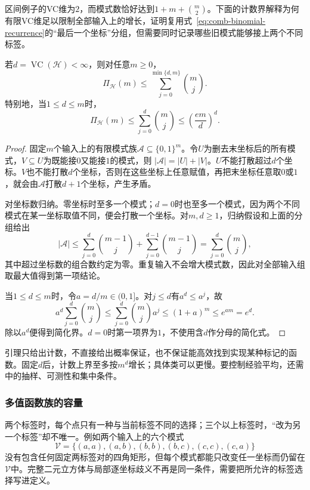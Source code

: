 区间例子的VC维为\(2\)，而模式数恰好达到\(1+m+\binom m2\)。下面的计数界解释为何有限VC维足以限制全部输入上的增长，证明复用式~\eqref{eq:comb-binomial-recurrence}的“最后一个坐标”分组，但需要同时记录哪些旧模式能够接上两个不同标签。
\begin{lemma}
  \label{lem:sauer-shelah}
  若\(d=\operatorname{VC}(\mathcal H)<\infty\)，则对任意\(m\geq0\)，
  \[
    \Pi_{\mathcal H}(m)\leq\sum_{j=0}^{\min\{d,m\}}\binom mj.
  \]
  特别地，当\(1\leq d\leq m\)时，
  \begin{equation}
    \Pi_{\mathcal H}(m)\leq\sum_{j=0}^{d}\binom mj
    \leq\left(\frac{em}{d}\right)^d.
    \label{eq:sauer-shelah}
  \end{equation}
\end{lemma}
\begin{proof}
固定\(m\)个输入上的有限模式族\(\mathcal A\subseteq\{0,1\}^m\)。令\(U\)为删去末坐标后的所有模式，\(V\subseteq U\)为既能接\(0\)又能接\(1\)的模式，则
\( |\mathcal A|=|U|+|V|\)。\(U\)不能打散超过\(d\)个坐标。\(V\)也不能打散\(d\)个坐标，否则在这些坐标上任意赋值，再把末坐标任意取\(0\)或\(1\)，就会由\(\mathcal A\)打散\(d+1\)个坐标，产生矛盾。

对坐标数归纳。零坐标时至多一个模式；\(d=0\)时也至多一个模式，因为两个不同模式在某一坐标取值不同，便会打散一个坐标。对\(m,d\geq1\)，归纳假设和上面的分组给出
\[
  |\mathcal A|
  \leq\sum_{j=0}^{d}\binom{m-1}{j}
       +\sum_{j=0}^{d-1}\binom{m-1}{j}
  =\sum_{j=0}^{d}\binom mj,
\]
其中超过坐标数的组合数约定为零。重复输入不会增大模式数，因此对全部输入组取最大值得到第一项结论。

当\(1\leq d\leq m\)时，令\(a=d/m\in(0,1]\)。对\(j\leq d\)有\(a^d\leq a^j\)，故
\[
  a^d\sum_{j=0}^{d}\binom mj
  \leq\sum_{j=0}^{d}\binom mj a^j
  \leq(1+a)^m\leq e^{am}=e^d.
\]
除以\(a^d\)便得到简化界。\(d=0\)时第一项界为\(1\)，不使用含\(d\)作分母的简化式。
\end{proof}
引理只给出计数，不直接给出概率保证，也不保证能高效找到实现某种标记的函数。固定\(d\)后，计数上界至多按\(m^d\)增长；具体类可以更慢。要控制经验平均，还需中的抽样、可测性和集中条件。

\subsubsection{多值函数族的容量}
\label{sec:comb-multiclass-dimensions}

两个标签时，每个点只有一种与当前标签不同的选择；三个以上标签时，“改为另一个标签”却不唯一。例如两个输入上的六个模式
\[
  \mathcal V=\{(a,a),(a,b),(b,b),(b,c),(c,c),(c,a)\}
\]
没有包含任何固定两标签对的四角矩形，但每个模式都能只改变任一坐标而仍留在\(\mathcal V\)中。完整二元立方体与局部逐坐标歧义不再是同一条件，需要把所允许的标签选择写进定义。

